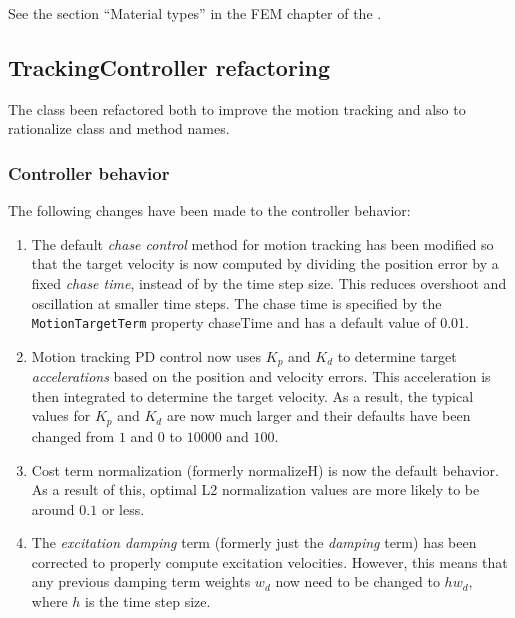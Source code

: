 \documentclass{article}
\begin{document}
See the section ``Material types'' in the FEM chapter of the 
.

\subsection{TrackingController refactoring}

The  class been
refactored both to improve the motion tracking and also to rationalize class
and method names.

\subsubsection{Controller behavior}

The following changes have been made to the controller behavior:

\begin{enumerate}

\item The default {\it chase control} method for motion tracking has been
modified so that the target velocity is now computed by dividing the position
error by a fixed {\it chase time}, instead of by the time step size. This
reduces overshoot and oscillation at smaller time steps. The chase time is
specified by the {\tt MotionTargetTerm} property {\sf chaseTime} and has a
default value of 0.01.

\item Motion tracking PD control now uses $K_p$ and $K_d$ to determine target
{\it accelerations} based on the position and velocity errors. This
acceleration is then integrated to determine the target velocity.  As a result,
the typical values for $K_p$ and $K_d$ are now much larger and their defaults
have been changed from $1$ and $0$ to $10000$ and $100$.

\item Cost term normalization (formerly {\sf normalizeH}) is now the default
behavior. As a result of this, optimal L2 normalization values are more likely
to be around $0.1$ or less.

\item The {\it excitation damping} term (formerly just the {\it damping} term)
has been corrected to properly compute excitation velocities. However, this
means that any previous damping term weights $w_d$ now need to be changed to $h
w_d$, where $h$ is the time step size.

\end{enumerate}
\end{document}

